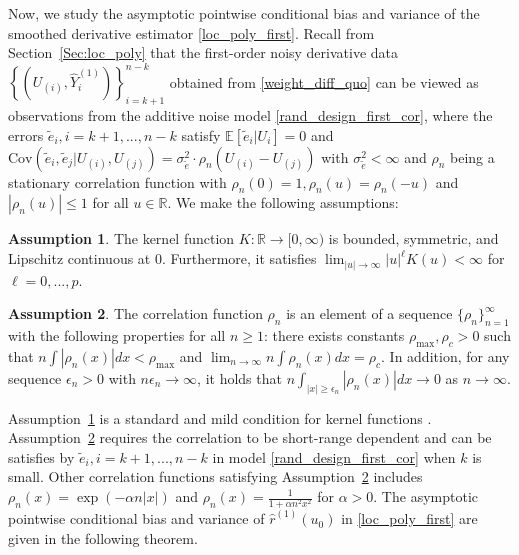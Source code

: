 \documentclass{uwstat572}
\theoremstyle{definition}
\newtheorem{assump}{Assumption}
\renewcommand{\hat}{\widehat}
\renewcommand{\tilde}{\widetilde}
\theoremstyle{theorem}
\begin{document}
Now, we study the asymptotic pointwise conditional bias and variance of the smoothed derivative estimator \eqref{loc_poly_first}. Recall from Section~\ref{Sec:loc_poly} that the first-order noisy derivative data $\left\{\left(U_{(i)},\hat{Y}_i^{(1)}\right)\right\}_{i=k+1}^{n-k}$ obtained from \eqref{weight_diff_quo} can be viewed as observations from the additive noise model \eqref{rand_design_first_cor}, where the errors $\tilde{e}_i, i=k+1,...,n-k$ satisfy $\mathbb{E}\left[\tilde{e}_i|U_i\right]=0$ and $\mathrm{Cov}\left(\tilde{e}_i,\tilde{e}_j | U_{(i)},U_{(j)} \right) = \sigma_{\tilde{e}}^2 \cdot \rho_n(U_{(i)}-U_{(j)})$ with $\sigma_{\tilde{e}}^2 <\infty$ and $\rho_n$ being a stationary correlation function with $\rho_n(0)=1, \rho_n(u) = \rho_n(-u)$ and $|\rho_n(u)|\leq 1$ for all $u\in \mathbb{R}$. We make the following assumptions:
\begin{assump}
\label{assump:kernel}
The kernel function $K:\mathbb{R}\to [0,\infty)$ is bounded, symmetric, and Lipschitz continuous at 0. Furthermore, it satisfies $\lim_{|u|\to \infty} |u|^{\ell} K(u) <\infty$ for $\ell=0,...,p$.
\end{assump}
\begin{assump}
\label{assump:cor_func}
The correlation function $\rho_n$ is an element of a sequence $\{\rho_n\}_{n=1}^{\infty}$ with the following properties for all $n\geq 1$: there exists constants $\rho_{\max}, \rho_c >0$ such that $n\int |\rho_n(x)| dx < \rho_{\max}$ and $\lim_{n\to \infty} n \int \rho_n(x) dx =\rho_c$. In addition, for any sequence $\epsilon_n>0$ with $n\epsilon_n\to \infty$, it holds that $n\int_{|x|\geq \epsilon_n} |\rho_n(x)| dx \to 0$ as $n\to \infty$. 
\end{assump}

Assumption~\ref{assump:kernel} is a standard and mild condition for kernel functions \citep{wasserman2006all}. Assumption~\ref{assump:cor_func} requires the correlation to be short-range dependent \citep{opsomer2001nonparametric} and can be satisfies by $\tilde{e}_i,i=k+1,...,n-k$ in model \eqref{rand_design_first_cor} when $k$ is small. Other correlation functions satisfying Assumption~\ref{assump:cor_func} includes $\rho_n(x) = \exp\left(-\alpha n |x|\right)$ and $\rho_n(x)=\frac{1}{1+\alpha n^2 x^2}$ for $\alpha >0$. The asymptotic pointwise conditional bias and variance of $\hat{r}^{(1)}(u_0)$ in \eqref{loc_poly_first} are given in the following theorem.
\end{document}
